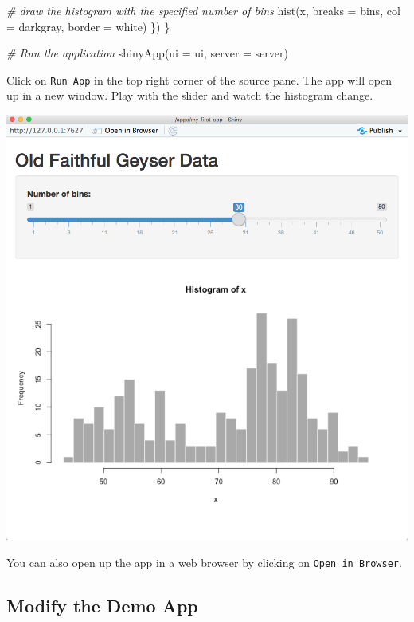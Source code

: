 \documentclass[
]{book}
\newenvironment{Shaded}{\begin{snugshade}}{\end{snugshade}}
\newcommand{\AttributeTok}[1]{\textcolor[rgb]{0.77,0.63,0.00}{#1}}
\newcommand{\CommentTok}[1]{\textcolor[rgb]{0.56,0.35,0.01}{\textit{#1}}}
\newcommand{\FunctionTok}[1]{\textcolor[rgb]{0.00,0.00,0.00}{#1}}
\newcommand{\NormalTok}[1]{#1}
\newcommand{\StringTok}[1]{\textcolor[rgb]{0.31,0.60,0.02}{#1}}
\begin{document}
\begin{Shaded}
\begin{Highlighting}[]
      \CommentTok{\# draw the histogram with the specified number of bins}
      \FunctionTok{hist}\NormalTok{(x, }\AttributeTok{breaks =}\NormalTok{ bins, }\AttributeTok{col =} \StringTok{\textquotesingle{}darkgray\textquotesingle{}}\NormalTok{, }\AttributeTok{border =} \StringTok{\textquotesingle{}white\textquotesingle{}}\NormalTok{)}
\NormalTok{   \})}
\NormalTok{\}}

\CommentTok{\# Run the application }
\FunctionTok{shinyApp}\NormalTok{(}\AttributeTok{ui =}\NormalTok{ ui, }\AttributeTok{server =}\NormalTok{ server)}
\end{Highlighting}
\end{Shaded}

Click on \texttt{Run\ App} in the top right corner of the source pane. The app will open up in a new window. Play with the slider and watch the histogram change.

\includegraphics{images/demo_app/05-app-interface.png}

You can also open up the app in a web browser by clicking on \texttt{Open\ in\ Browser}.

\hypertarget{modify-the-demo-app}{%
\subsection{Modify the Demo App}\label{modify-the-demo-app}}
\end{document}
